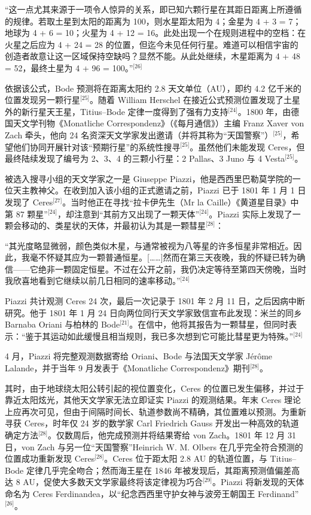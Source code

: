 “这一点尤其来源于一项令人惊异的关系，即已知六颗行星在其距日距离上所遵循的规律。若取土星到太阳的距离为 100，则水星距太阳为 4；金星为 4 + 3 = 7；地球为 4 + 6 = 10；火星为 4 + 12 = 16。此处出现一个在规则进程中的空档：在火星之后应为 4 + 24 = 28 的位置，但迄今未见任何行星。难道可以相信宇宙的创造者故意让这一区域保持空缺吗？显然不能。从此处继续，木星距离为 4 + 48 = 52，最终土星为 4 + 96 = 100。”\(^\text{[26]}\)

依据该公式，Bode 预测将在距离太阳约 2.8 天文单位（AU），即约 4.2 亿千米的位置发现另一颗行星\(^\text{[25]}\)。随着 William Herschel 在接近公式预测位置发现了土星外的新行星天王星，Titius–Bode 定律一度得到了强有力支持\(^\text{[24]}\)。1800 年，由德国天文学刊物《Monatliche Correspondenz》（《每月通信》）主编 Franz Xaver von Zach 牵头，他向 24 名资深天文学家发出邀请（并将其称为“天国警察”）\(^\text{[25]}\)，希望他们协同开展针对该“预期行星”的系统性搜寻\(^\text{[25]}\)。虽然他们未能发现 Ceres，但最终陆续发现了编号为 2、3、4 的三颗小行星：2 Pallas、3 Juno 与 4 Vesta\(^\text{[25]}\)。

被选入搜寻小组的天文学家之一是 Giuseppe Piazzi，他是西西里巴勒莫学院的一位天主教神父。在收到加入该小组的正式邀请之前，Piazzi 已于 1801 年 1 月 1 日发现了 Ceres\(^\text{[27]}\)。当时他正在寻找“拉卡伊先生（Mr la Caille）《黄道星目录》中第 87 颗星”\(^\text{[24]}\)，却注意到“其前方又出现了一颗天体”\(^\text{[24]}\)。Piazzi 实际上发现了一颗会移动的、类星状的天体，并最初认为其是一颗彗星\(^\text{[28]}\)：

“其光度略显微弱，颜色类似木星，与通常被视为八等星的许多恒星非常相近。因此，我毫不怀疑其应为一颗普通恒星。[……]然而在第三天夜晚，我的怀疑已转为确信——它绝非一颗固定恒星。不过在公开之前，我仍决定等待至第四天傍晚，当时我欣喜地看到它继续以前几日相同的速率移动。”\(^\text{[24]}\)

Piazzi 共计观测 Ceres 24 次，最后一次记录于 1801 年 2 月 11 日，之后因病中断研究。他于 1801 年 1 月 24 日向两位同行天文学家致信宣布此发现：米兰的同乡 Barnaba Oriani 与柏林的 Bode\(^\text{[21]}\)。在信中，他将其报告为一颗彗星，但同时表示：“鉴于其运动如此缓慢且相当规则，我已多次想到它可能比彗星更为特殊。”\(^\text{[24]}\)

4 月，Piazzi 将完整观测数据寄给 Oriani、Bode 与法国天文学家 Jérôme Lalande，并于当年 9 月发表于《Monatliche Correspondenz》期刊\(^\text{[28]}\)。

其时，由于地球绕太阳公转引起的视位置变化，Ceres 的位置已发生偏移，并过于靠近太阳炫光，其他天文学家无法立即证实 Piazzi 的观测结果。年末 Ceres 理论上应再次可见，但由于间隔时间长、轨道参数尚不精确，其位置难以预测。为重新寻获 Ceres，时年仅 24 岁的数学家 Carl Friedrich Gauss 开发出一种高效的轨道确定方法\(^\text{[28]}\)。仅数周后，他完成预测并将结果寄给 von Zach。1801 年 12 月 31 日，von Zach 与另一位“天国警察”Heinrich W. M. Olbers 在几乎完全符合预测的位置成功重新发现 Ceres\(^\text{[28]}\)。Ceres 位于距太阳 2.8 AU 的轨道位置，与 Titius–Bode 定律几乎完全吻合；然而海王星在 1846 年被发现后，其距离预测值偏差高达 8 AU，促使大多数天文学家最终将该定律视为巧合\(^\text{[29]}\)。Piazzi 将新发现的天体命名为 Ceres Ferdinandea，以“纪念西西里守护女神与波旁王朝国王 Ferdinand”\(^\text{[26]}\)。
